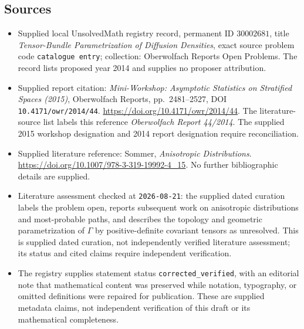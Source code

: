 \documentclass[11pt]{article}
\begin{document}
\subsection{Sources}
\begin{itemize}
\item Supplied local UnsolvedMath registry record, permanent ID \(30002681\), title \emph{Tensor-Bundle Parametrization of Diffusion Densities}, exact source problem code \texttt{catalogue entry}; collection: Oberwolfach Reports Open Problems. The record lists proposed year 2014 and supplies no proposer attribution.
\item Supplied report citation: \emph{Mini-Workshop: Asymptotic Statistics on Stratified Spaces (2015)}, Oberwolfach Reports, pp.\ 2481--2527, DOI \texttt{10.4171/owr/2014/44}. \url{https://doi.org/10.4171/owr/2014/44}. The literature-source list labels this reference \emph{Oberwolfach Report 44/2014}. The supplied 2015 workshop designation and 2014 report designation require reconciliation.
\item Supplied literature reference: Sommer, \emph{Anisotropic Distributions}. \url{https://doi.org/10.1007/978-3-319-19992-4_15}. No further bibliographic details are supplied.
\item Literature assessment checked at \texttt{2026-08-21}: the supplied dated curation labels the problem open, reports subsequent work on anisotropic distributions and most-probable paths, and describes the topology and geometric parametrization of \(\Gamma\) by positive-definite covariant tensors as unresolved. This is supplied dated curation, not independently verified literature assessment; its status and cited claims require independent verification.
\item The registry supplies statement status \texttt{corrected\_verified}, with an editorial note that mathematical content was preserved while notation, typography, or omitted definitions were repaired for publication. These are supplied metadata claims, not independent verification of this draft or its mathematical completeness.
\end{itemize}
\end{document}
